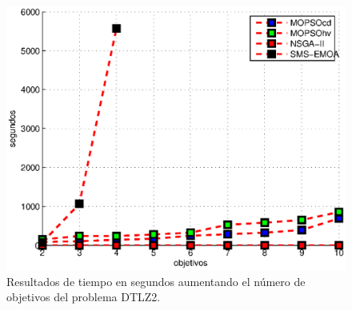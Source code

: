  \begin{figure}
      \begin{center}
	  \includegraphics[scale=1]{Cap4/tiempoEscala.eps}
      \end{center}
	\caption[Tiempos en escalamiento para el problema DTLZ2.]{Resultados de tiempo en segundos aumentando el n\'umero 
	de objetivos del problema DTLZ2.}
      \label{fig:tescala}
  \end{figure}

 